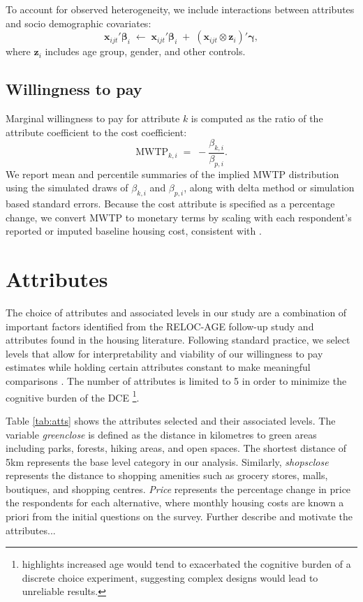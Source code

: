 \documentclass[3p,12pt ]{elsarticle}
\begin{document}
To account for observed heterogeneity, we include interactions between attributes and socio demographic covariates:
\begin{equation}
\mathbf{x}_{ijt}' \boldsymbol{\beta}_i \; \leftarrow \; \mathbf{x}_{ijt}' \boldsymbol{\beta}_i \;+\; \left( \mathbf{x}_{ijt} \otimes \mathbf{z}_i \right)'\boldsymbol{\gamma},
\end{equation}
where $\mathbf{z}_i$ includes age group, gender, and other controls.

\subsection{Willingness to pay}
Marginal willingness to pay for attribute $k$ is computed as the ratio of the attribute coefficient to the cost coefficient:
\begin{equation}
\text{MWTP}_{k,i} \;=\; - \frac{\beta_{k,i}}{\beta_{p,i}}.
\end{equation}
We report mean and percentile summaries of the implied MWTP distribution using the simulated draws of $\beta_{k,i}$ and $\beta_{p,i}$, along with delta method or simulation based standard errors. Because the cost attribute is specified as a percentage change, we convert MWTP to monetary terms by scaling with each respondent's reported or imputed baseline housing cost, consistent with \citet{Caplan2021}.


\section{Attributes}

The choice of attributes and associated levels in our study are a combination of important factors identified from the RELOC-AGE follow-up study and attributes found in the housing literature.
Following standard practice,
we select levels that allow for interpretability and viability of our willingness to pay estimates while holding certain attributes constant to make meaningful comparisons \citep{hensherAppliedChoiceAnalysis2015}.
The number of attributes is limited to 5 in order to minimize the cognitive burden of the DCE \citep{manghamHowNotDesigning2009,deshazoDesigningChoiceSets2002}
\footnote{\cite{himmlerWhatWorksBetter2021} highlights increased age would tend to exacerbated the cognitive burden of a discrete choice experiment, suggesting complex designs would lead to unreliable results.}.


Table \ref{tab:atts} shows the attributes selected and their associated levels.
The variable \textit{greenclose} is defined as the distance in kilometres to green areas including parks, forests, hiking areas, and open spaces.
The shortest distance of 5km represents the base level category in our analysis.
Similarly,
\textit{shopsclose} represents the distance to shopping amenities such as grocery stores, malls, boutiques, and shopping centres.
\textit{Price} represents the percentage change in price the respondents for each alternative,
where monthly housing costs are known a priori from the initial questions on the survey.
Further describe and motivate the attributes...
\end{document}
